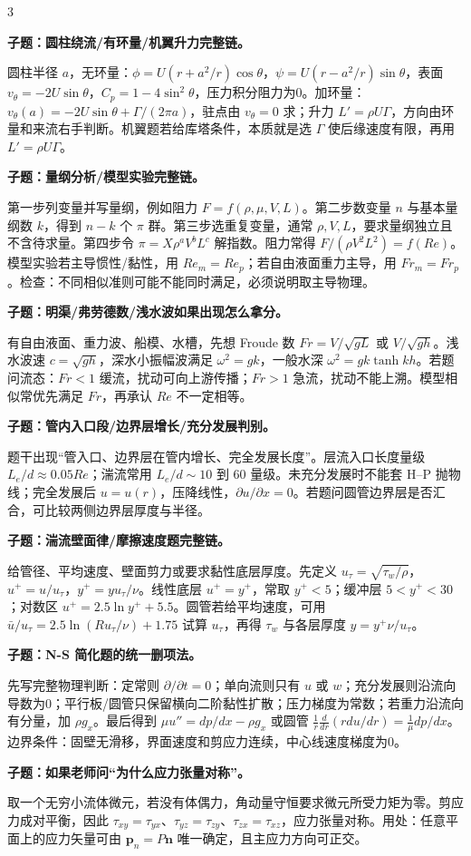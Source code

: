 \documentclass[a4paper]{article}
\newcommand{\qt}[1]{\vspace{0.25pt}\colorbox{Q}{\parbox{\dimexpr\linewidth-2\fboxsep}{\color{white}\bfseries #1}}\par}
\newcommand{\ans}[1]{\colorbox{G}{\parbox{\dimexpr\linewidth-2\fboxsep}{#1}}\par}
\begin{document}
\begin{multicols}{3}
\qt{子题：圆柱绕流/有环量/机翼升力完整链。}
\ans{圆柱半径 $a$，无环量：$\phi=U(r+a^2/r)\cos\theta$，$\psi=U(r-a^2/r)\sin\theta$，表面 $v_\theta=-2U\sin\theta$，$C_p=1-4\sin^2\theta$，压力积分阻力为0。加环量：$v_\theta(a)=-2U\sin\theta+\Gamma/(2\pi a)$，驻点由 $v_\theta=0$ 求；升力 $L'=\rho U\Gamma$，方向由环量和来流右手判断。机翼题若给库塔条件，本质就是选 $\Gamma$ 使后缘速度有限，再用 $L'=\rho U\Gamma$。}
\qt{子题：量纲分析/模型实验完整链。}
\ans{第一步列变量并写量纲，例如阻力 $F=f(\rho,\mu,V,L)$。第二步数变量 $n$ 与基本量纲数 $k$，得到 $n-k$ 个 $\pi$ 群。第三步选重复变量，通常 $\rho,V,L$，要求量纲独立且不含待求量。第四步令 $\pi=X\rho^aV^bL^c$ 解指数。阻力常得 $F/(\rho V^2L^2)=f(Re)$。模型实验若主导惯性/黏性，用 $Re_m=Re_p$；若自由液面重力主导，用 $Fr_m=Fr_p$。检查：不同相似准则可能不能同时满足，必须说明取主导物理。}
\qt{子题：明渠/弗劳德数/浅水波如果出现怎么拿分。}
\ans{有自由液面、重力波、船模、水槽，先想 Froude 数 $Fr=V/\sqrt{gL}$ 或 $V/\sqrt{gh}$。浅水波速 $c=\sqrt{gh}$，深水小振幅波满足 $\omega^2=gk$，一般水深 $\omega^2=gk\tanh kh$。若题问流态：$Fr<1$ 缓流，扰动可向上游传播；$Fr>1$ 急流，扰动不能上溯。模型相似常优先满足 $Fr$，再承认 $Re$ 不一定相等。}
\qt{子题：管内入口段/边界层增长/充分发展判别。}
\ans{题干出现“管入口、边界层在管内增长、完全发展长度”。层流入口长度量级 $L_e/d\approx0.05Re$；湍流常用 $L_e/d\sim10$ 到 $60$ 量级。未充分发展时不能套 H--P 抛物线；完全发展后 $u=u(r)$，压降线性，$\partial u/\partial x=0$。若题问圆管边界层是否汇合，可比较两侧边界层厚度与半径。}
\qt{子题：湍流壁面律/摩擦速度题完整链。}
\ans{给管径、平均速度、壁面剪力或要求黏性底层厚度。先定义 $u_\tau=\sqrt{\tau_w/\rho}$，$u^+=u/u_\tau$，$y^+=yu_\tau/\nu$。线性底层 $u^+=y^+$，常取 $y^+<5$；缓冲层 $5<y^+<30$；对数区 $u^+=2.5\ln y^+ +5.5$。圆管若给平均速度，可用 $\bar u/u_\tau=2.5\ln(Ru_\tau/\nu)+1.75$ 试算 $u_\tau$，再得 $\tau_w$ 与各层厚度 $y= y^+\nu/u_\tau$。}
\qt{子题：N-S 简化题的统一删项法。}
\ans{先写完整物理判断：定常则 $\partial/\partial t=0$；单向流则只有 $u$ 或 $w$；充分发展则沿流向导数为0；平行板/圆管只保留横向二阶黏性扩散；压力梯度为常数；若重力沿流向有分量，加 $\rho g_x$。最后得到 $\mu u''=dp/dx-\rho g_x$ 或圆管 $\frac1r\frac d{dr}(rdu/dr)=\frac1\mu dp/dx$。边界条件：固壁无滑移，界面速度和剪应力连续，中心线速度梯度为0。}
\qt{子题：如果老师问“为什么应力张量对称”。}
\ans{取一个无穷小流体微元，若没有体偶力，角动量守恒要求微元所受力矩为零。剪应力成对平衡，因此 $\tau_{xy}=\tau_{yx}$、$\tau_{yz}=\tau_{zy}$、$\tau_{zx}=\tau_{xz}$，应力张量对称。用处：任意平面上的应力矢量可由 $\bm p_n=P\bm n$ 唯一确定，且主应力方向可正交。}


\end{multicols}
\end{document}
